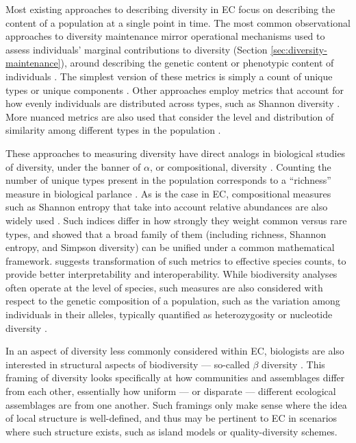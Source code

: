 Most existing approaches to describing diversity in EC focus on describing the content of a population at a single point in time.
The most common observational approaches to diversity maintenance mirror operational mechanisms used to assess individuals' marginal contributions to diversity (Section \ref{sec:diversity-maintenance}), around describing the genetic content or phenotypic content of individuals \citep{hernandez2022can,nguyen2006brief}.
The simplest version of these metrics is simply a count of unique types or unique components \citep{jackson2010promoting,mcphee1999analysis}.
Other approaches employ metrics that account for how evenly individuals are distributed across types, such as Shannon diversity \citep{burke2002advanced,burke2004diversity}.
More nuanced metrics are also used that consider the level and distribution of similarity among different types in the population \citep{morrison2002measurement,corriveau2012review,smit2011population}.

These approaches to measuring diversity have direct analogs in biological studies of diversity, under the banner of $\alpha$, or compositional, diversity \citep{noss1990indicators,fisher1943relation}.
Counting the number of unique types present in the population corresponds to a ``richness'' measure in biological parlance \citep{magurran2021measuring}.
As is the case in EC, compositional measures such as Shannon entropy that take into account relative abundances are also widely used \citep{magurran2021measuring}.
Such indices differ in how strongly they weight common versus rare types, and \citet{hill1973diversity} showed that a broad family of them (including richness, Shannon entropy, and Simpson diversity) can be unified under a common mathematical framework.
\citet{jost2006entropy} suggests transformation of such metrics to effective species counts, to provide better interpretability and interoperability.
While biodiversity analyses often operate at the level of species, such measures are also considered with respect to the genetic composition of a population, such as the variation among individuals in their alleles, typically quantified as heterozygosity or nucleotide diversity \citep{nei1973analysis}.

In an aspect of diversity less commonly considered within EC, biologists are also interested in structural aspects of biodiversity --- so-called $\beta$ diversity \citep{noss1990indicators,whittaker1960vegetation}.
This framing of diversity looks specifically at how communities and assemblages differ from each other, essentially how uniform --- or disparate --- different ecological assemblages are from one another.
Such framings only make sense where the idea of local structure is well-defined, and thus may be pertinent to EC in scenarios where such structure exists, such as island models or quality-diversity schemes.

